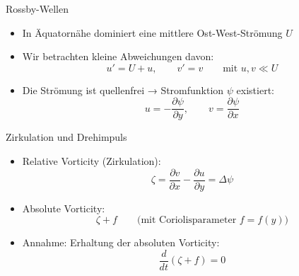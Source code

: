 

\begin{frame}{Rossby-Wellen}
	\begin{itemize}
		\item In Äquatornähe dominiert eine mittlere Ost-West-Strömung \( U \)
		\item Wir betrachten kleine Abweichungen davon:
		      \[
			      u' = U + u, \qquad v' = v \qquad \text{mit } u, v \ll U
		      \]
		\item Die Strömung ist quellenfrei → Stromfunktion \( \psi \) existiert:
		      \[
			      u = -\frac{\partial \psi}{\partial y}, \qquad v = \frac{\partial \psi}{\partial x}
		      \]
	\end{itemize}
\end{frame}

\begin{frame}{Zirkulation und Drehimpuls}
	\begin{itemize}
		\item Relative Vorticity (Zirkulation):
		      \[
			      \zeta = \frac{\partial v}{\partial x} - \frac{\partial u}{\partial y} = \Delta \psi
		      \]
		\item Absolute Vorticity:
		      \[
			      \zeta + f \qquad \text{(mit Coriolisparameter } f = f(y) \text{)}
		      \]
		\item Annahme: Erhaltung der absoluten Vorticity:
		      \[
			      \frac{d}{dt} (\zeta + f) = 0
		      \]
	\end{itemize}
\end{frame}

